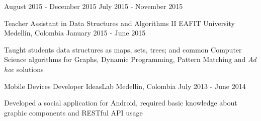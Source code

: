\begin{cventries}
{\begin{cvsubentries}
                      {August 2015 - December 2015}{}
                      {July 2015 - November 2015}{}
      \end{cvsubentries}
    }
  \cventry
    {Teacher Assistant in Data Structures and Algorithms II}
    {EAFIT University}
    {Medellín, Colombia}
    {January 2015 - June 2015}
    {
      \begin{cvitems}
        \item {Taught students data structures as maps, sets, trees; and common Computer Science
               algorithms for Graphs, Dynamic Programming, Pattern Matching and \textit{Ad hoc}
               solutions}
      \end{cvitems}
    }
  \cventry
    {Mobile Devices Developer}
    {IdeasLab}
    {Medellín, Colombia}
    {July 2013 - June 2014}
    {
      \begin{cvitems}
        \item {Developed a social application for Android, required basic knowledge about graphic
               components and RESTful API usage}
      \end{cvitems}
      \begin{cvsubentries}
      \end{cvsubentries}
    }
\end{cventries}
